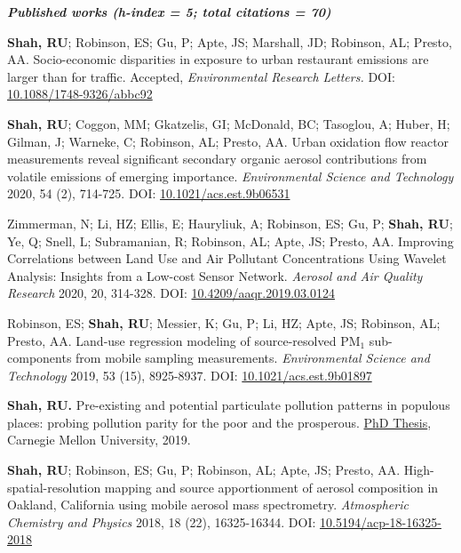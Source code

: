 \documentclass{article}
\begin{document}
\hrulefill
\textit{\textbf{  Published works (h-index = 5; total citations = 70)  }}
\hrulefill
\begin{etaremune}
\item \textbf{Shah, RU}; Robinson, ES; Gu, P; Apte, JS; Marshall, JD; Robinson, AL; Presto, AA. Socio-economic disparities in exposure to urban restaurant emissions are larger than for traffic. Accepted, \textit{Environmental Research Letters.} DOI: \href{https://doi.org/10.1088/1748-9326/abbc92}{10.1088/1748-9326/abbc92}
\item \textbf{Shah, RU}; Coggon, MM; Gkatzelis, GI; McDonald, BC; Tasoglou, A; Huber, H; Gilman, J; Warneke, C; Robinson, AL; Presto, AA. Urban oxidation flow reactor measurements reveal significant secondary organic aerosol contributions from volatile emissions of emerging importance. \textit{Environmental Science and Technology} 2020, 54 (2), 714-725. DOI: \href{https://doi.org/10.1021/acs.est.9b06531}{10.1021/acs.est.9b06531}
\item Zimmerman, N; Li, HZ; Ellis, E; Hauryliuk, A; Robinson, ES; Gu, P; \textbf{Shah, RU}; Ye, Q; Snell, L; Subramanian, R; Robinson, AL; Apte, JS; Presto, AA. Improving Correlations between Land Use and Air Pollutant Concentrations Using Wavelet Analysis: Insights from a Low-cost Sensor Network. \textit{Aerosol and Air Quality Research} 2020, 20, 314-328. DOI: \href{http://www.aaqr.org/doi/10.4209/aaqr.2019.03.0124}{10.4209/aaqr.2019.03.0124}
\item Robinson, ES; \textbf{Shah, RU}; Messier, K; Gu, P; Li, HZ; Apte, JS; Robinson, AL; Presto, AA. Land-use regression modeling of source-resolved PM$_1$ sub-components from mobile sampling measurements. \textit{Environmental Science and Technology} 2019, 53 (15), 8925-8937. DOI: \href{https://doi.org/10.1021/acs.est.9b01897}{10.1021/acs.est.9b01897}
\item \textbf{Shah, RU.} Pre-existing and potential particulate pollution patterns in populous places: probing pollution parity for the poor and the prosperous. \href{https://search.proquest.com/openview/a52fa8ba9f1b4ffe2e6e7b09ca6e2397/1.pdf?pq-origsite=gscholar&cbl=18750&diss=y}{PhD Thesis}, Carnegie Mellon University, 2019.
\item \textbf{Shah, RU}; Robinson, ES; Gu, P; Robinson, AL; Apte, JS; Presto, AA. High-spatial-resolution mapping and source apportionment of aerosol composition in Oakland, California using mobile aerosol mass spectrometry. \textit{Atmospheric Chemistry and Physics} 2018, 18 (22), 16325-16344. DOI: \href{https://www.atmos-chem-phys.net/18/16325/2018/}{10.5194/acp-18-16325-2018}

\end{etaremune}
\end{document}
